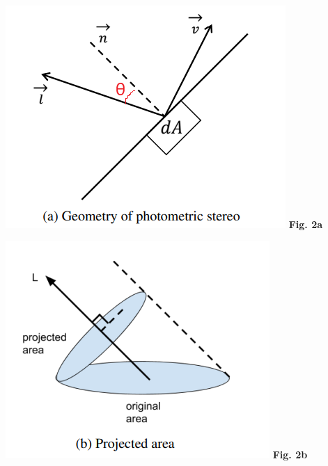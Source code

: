 \documentclass{article}
\begin{document}
	\begin{minipage}{0.48\linewidth}
	\centering
	\includegraphics[width=\linewidth]{./Q1_a.png}
	\textbf{Fig. 2a} %
	\label{fig:Q1_a}         %
	\end{minipage}
	\hfill
	\begin{minipage}{0.48\linewidth}
	\centering
	\includegraphics[width=\linewidth]{./Q1_b.png}
	\textbf{Fig. 2b} %
	\label{fig:Q1_b}         %
	\end{minipage}	
	\newline
	
\end{document}

